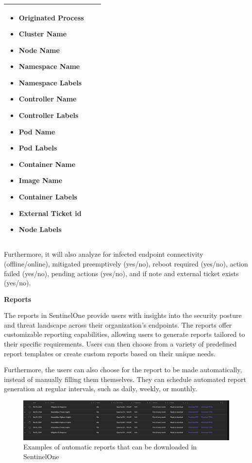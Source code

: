 \begin{longtable}{|p{4cm}|p{4cm}|p{8cm}|}
\begin{itemize}
            \item Originated Process
            \item Cluster Name
            \item Node Name
            \item Namespace Name
            \item Namespace Labels
            \item Controller Name
            \item Controller Labels
            \item Pod Name
            \item Pod Labels
            \item Container Name
            \item Image Name
            \item Container Labels
            \item External Ticket \acrshort{id}
            \item Node Labels
      \end{itemize} \\
      \hline
\end{longtable}

\begin{multicols}{2}
      Furthermore, it will also analyze for infected endpoint connectivity (offline/online), mitigated preemptively (yes/no),
      reboot required (yes/no), action failed (yes/no), pending actions (yes/no), and if note and external ticket exists (yes/no).

      \textbf{Reports}

      The reports in SentinelOne provide users with insights into the security posture and threat landscape across their organization's
      endpoints. The reports offer customizable reporting capabilities, allowing users to generate reports tailored to their specific
      requirements. Users can then choose from a variety of predefined report templates or create custom reports based on their unique
      needs.

      Furthermore, the users can also choose for the report to be made automatically, instead of manually filling them themselves. They can
      schedule automated report generation at regular intervals, such as daily, weekly, or monthly.

\end{multicols}

\begin{figure}[htbp]
      \centering
      \includegraphics[width=1.0\textwidth]{Figures/SentinelOne/Reports.png}
      \caption{Examples of automatic reports that can be downloaded in SentinelOne}
      \label{fig:Reports}
\end{figure}


